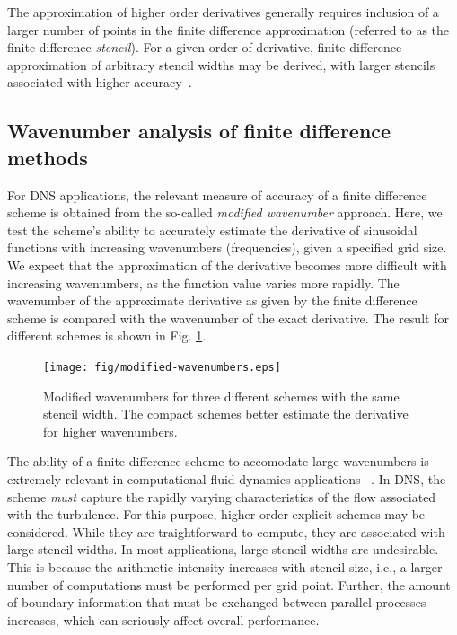 The approximation of higher order derivatives generally requires
inclusion of a larger number of points in the
finite difference approximation
(referred to as the finite difference \emph{stencil}).
For a given order of derivative,
finite difference approximation of arbitrary stencil widths
may be derived,
with larger stencils associated with higher accuracy~\cite{fornberg1988generation}.

\subsection{Wavenumber analysis of finite difference methods}

For DNS applications, the relevant measure of accuracy of a
finite difference scheme is obtained from the so-called
\emph{modified wavenumber} approach.
Here, we test the scheme's ability to
accurately estimate the derivative of sinusoidal functions
with increasing wavenumbers (frequencies),
given a specified grid size. 
We expect that the approximation of the derivative
becomes more difficult with increasing wavenumbers,
as the function value varies more rapidly.
The wavenumber of the approximate derivative
as given by the finite difference scheme is compared with
the wavenumber of the exact derivative.
The result for different schemes is shown
in Fig. \ref{fig:modified-wavenumbers}.

\begin{figure}
\begin{center}
\texttt{[image: fig/modified-wavenumbers.eps]}
\end{center}
\caption{Modified wavenumbers for three different schemes
    with the same stencil width.
    The compact schemes better estimate the derivative
    for higher wavenumbers.}
\label{fig:modified-wavenumbers}
\end{figure}

The ability of a finite difference scheme
to accomodate large wavenumbers
is extremely relevant in
computational fluid dynamics applications
~\cite{KravchenkoEffNumErr}.
In DNS, the scheme
\emph{must} capture the
rapidly varying characteristics of the flow
associated with the turbulence.
For this purpose,
higher order explicit schemes
may be considered.
While they are traightforward to compute,
they are associated with large stencil widths.
In most applications,
large stencil widths are undesirable.
This is because
the arithmetic intensity increases with stencil size, i.e.,
a larger number of computations must be performed per grid point.
Further,
the amount of boundary information that must be exchanged
between parallel processes increases,
which can seriously affect overall performance.

